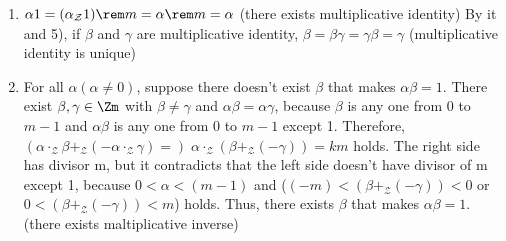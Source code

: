 \documentclass{article}
\theoremstyle{thmstyleone}
\theoremstyle{thmstyletwo}
\theoremstyle{thmstylethree}
\newcommand\Z{\mathcal Z}
\begin{document}
\begin{enumerate}[label=(\alph*)]
\begin{enumerate}[label = \arabic*']
\begin{enumerate}[label=\arabic*)]
          \item\label{it:ex1.3.a.r.B3} $\alpha1 = (\alpha _\Z1)\rem m = \alpha \rem m = \alpha$ (there exists multiplicative identity)
            By it and 5), if $\beta$ and $\gamma$ are multiplicative identity, $\beta = \beta\gamma = \gamma\beta = \gamma$ (multiplicative identity is unique)
          \item For all $\alpha (\alpha \neq 0)$, suppose there doesn't exist $\beta$ that makes $\alpha\beta = 1$.
            There exist $\beta, \gamma \in \Zm$ with $\beta \neq \gamma$ and $\alpha\beta = \alpha\gamma$, because $\beta$ is any one from 0 to $m-1$ and $\alpha\beta$ is any one from 0 to $m-1$ except 1.
            Therefore, $(\alpha \cdot_\Z \beta +_\Z (- \alpha \cdot_\Z \gamma) =)\; \alpha \cdot_\Z (\beta +_\Z (-\gamma)) = km$ holds.
            The right side has divisor m, but it contradicts that the left side doesn't have divisor of m except 1,  because $0<\alpha<(m-1)$ and ($(-m)<(\beta +_\Z (-\gamma))<0$ or $0<(\beta +_\Z (-\gamma))<m$) holds.
            Thus, there exists $\beta$ that makes $\alpha\beta = 1$.(there exists maltiplicative inverse)
            

\end{enumerate}
\end{enumerate}
\end{enumerate}
\end{document}
